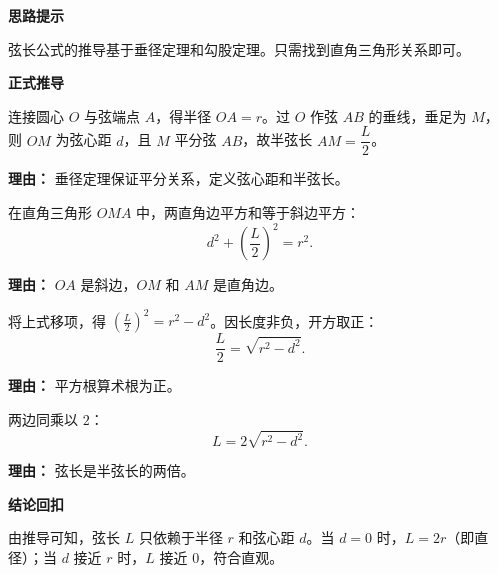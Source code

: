 \begin{proofbox}
	\textbf{\textcolor{CProof}{思路提示}}

	弦长公式的推导基于垂径定理和勾股定理。只需找到直角三角形关系即可。

	\medskip
	\textbf{\textcolor{CProof}{正式推导}}
	\begin{description}[style=nextline, leftmargin=2.8em, labelsep=0.5em, itemsep=0.55em]
		\item[\textbf{步骤一（构造直角三角形）：}]
			连接圆心 $O$ 与弦端点 $A$，得半径 $OA=r$。过 $O$ 作弦 $AB$ 的垂线，垂足为 $M$，则 $OM$ 为弦心距 $d$，且 $M$ 平分弦 $AB$，故半弦长 $AM = \dfrac{L}{2}$。
			\par\textbf{理由：}
			垂径定理保证平分关系，定义弦心距和半弦长。

		\item[\textbf{步骤二（勾股定理）：}]
			在直角三角形 $OMA$ 中，两直角边平方和等于斜边平方：
			\[
				d^{2} + \left(\frac{L}{2}\right)^{2} = r^{2}.
			\]
			\par\textbf{理由：}
			$OA$ 是斜边，$OM$ 和 $AM$ 是直角边。

		\item[\textbf{步骤三（代数整理）：}]
			将上式移项，得 $\left(\frac{L}{2}\right)^{2} = r^{2} - d^{2}$。因长度非负，开方取正：
			\[
				\frac{L}{2} = \sqrt{r^{2} - d^{2}}.
			\]
			\par\textbf{理由：}
			平方根算术根为正。

		\item[\textbf{步骤四（得最终形式）：}]
			两边同乘以 $2$：
			\[
				L = 2\sqrt{r^{2} - d^{2}}.
			\]
			\par\textbf{理由：}
			弦长是半弦长的两倍。
	\end{description}

	\medskip
	\textbf{\textcolor{CProof}{结论回扣}}

	由推导可知，弦长 $L$ 只依赖于半径 $r$ 和弦心距 $d$。当 $d=0$ 时，$L=2r$（即直径）；当 $d$ 接近 $r$ 时，$L$ 接近 $0$，符合直观。
\end{proofbox}
